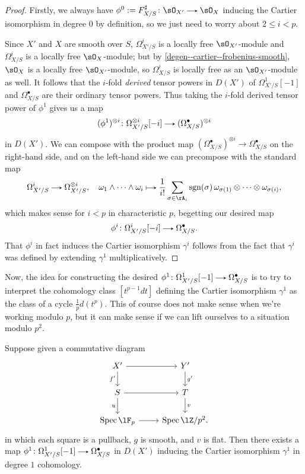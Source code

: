 \begin{proof}
  Firstly, we always have $\phi^0 \ce F_{X/S}^\sharp \c \sO_{X'} \to \sO_X$ inducing the Cartier isomorphism in degree $0$ by definition, so we just need to worry about $2 \le i < p$.

  Since $X'$ and $X$ are smooth over $S$, $\Omega_{X'/S}^i$ is a locally free $\sO_{X'}$-module and $\Omega_{X/S}^i$ is a locally free $\sO_X$-module; but by \cref{degen--cartier--frobenius-smooth}, $\sO_X$ is a locally free $\sO_{X'}$-module, so $\Omega_{X/S}^i$ is locally free as an $\sO_{X'}$-module as well. It follows that the $i$-fold \emph{derived} tensor powers in $D(X')$ of $\Omega_{X'/S}^1[-1]$ and $\Omega_{X/S}^\bullet$ are their ordinary tensor powers. Thus taking the $i$-fold derived tensor power of $\phi^1$ gives us a map
  \[
    (\phi^1)^{\otimes i} \c \Omega_{X'/S}^{\otimes i}[-i] \to (\Omega_{X/S}^\bullet)^{\otimes i}
  \]
  in $D(X')$. We can compose with the product map $(\Omega_{X/S}^\bullet)^{\otimes i} \to \Omega_{X/S}^\bullet$ on the right-hand side, and on the left-hand side we can precompose with the standard map
  \[
    \Omega_{X'/S}^i \to \Omega_{X'/S}^{\otimes i}, \quad
    \omega_1 \wedge \cdots \wedge \omega_i \mapsto \frac{1}{i!} \sum_{\sigma \in \rA_i} \operatorname{sgn}(\sigma)\, \omega_{\sigma(1)} \otimes \cdots \otimes \omega_{\sigma(i)},
  \]
  which makes sense for $i < p$ in characteristic $p$, begetting our desired map
  \[
    \phi^i \c \Omega_{X'/S}^i[-i] \to \Omega_{X/S}^\bullet.
  \]
  That $\phi^i$ in fact induces the Cartier isomorphism $\gamma^i$ follows from the fact that $\gamma^i$ was defined by extending $\gamma^1$ multiplicatively.
\end{proof}

Now, the idea for constructing the desired $\phi^1 \c \Omega_{X'/S}^1[-1] \to \Omega_{X/S}^\bullet$ is to try to interpret the cohomology class $[t^{p-1}dt]$ defining the Cartier isomorphism $\gamma^1$ as the class of a cycle $\frac{1}{p} d(t^p)$. This of course does not make sense when we're working modulo $p$, but it can make sense if we can lift ourselves to a situation modulo $p^2$.

\begin{proposition}
  \label{degen--lift--main}
  Suppose given a commutative diagram
  \[
    \begin{tikzcd}
      X' \ar[r] \ar[d, "f'", swap] &
      Y' \ar[d, "g'"] \\
      S \ar[r] \ar[d, "u", swap] &
      T \ar[d, "v"] \\
      \Spec \lF_p \ar[r] &
      \Spec \lZ/p^2.
    \end{tikzcd}
  \]
  in which each square is a pullback, $g$ is smooth, and $v$ is flat. Then there exists a map $\phi^1 \c \Omega_{X'/S}^1[-1] \to \Omega_{X/S}^\bullet$ in $D(X')$ inducing the Cartier isomorphism $\gamma^1$ in degree $1$ cohomology.
\end{proposition}

